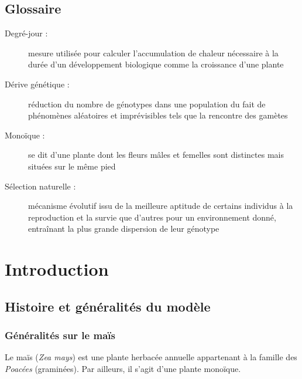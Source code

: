 \documentclass[12pt,a4paper]{report}
\begin{document}
	\tableofcontents
	\listoffigures
	\newpage
	
	\section*{Glossaire}
		\begin{description}
			
			\item [Degré-jour :] mesure utilisée pour calculer l'accumulation de chaleur nécessaire à la durée d'un développement biologique comme la croissance d'une plante
			
			\item [Dérive génétique :] réduction du nombre de génotypes dans une population du fait de phénomènes aléatoires et imprévisibles tels que la rencontre des gamètes
			
			\item [Monoïque :] se dit d'une plante dont les fleurs mâles et femelles sont distinctes mais situées sur le même pied
			
			\item [Sélection naturelle :] mécanisme évolutif issu de la meilleure aptitude de certains individus à la reproduction et la survie que d'autres pour un environnement donné, entraînant la plus grande dispersion de leur génotype
			
		
			
		\end{description}
		 
	
	\chapter{Introduction}
		\section{Histoire et généralités du modèle}
			\subsection{Généralités sur le maïs}
				Le maïs (\textit{Zea mays}) est une plante herbacée annuelle appartenant à la famille des \emph{Poacées} (graminées). Par ailleurs, il s'agit d'une plante monoïque.
\end{document}

